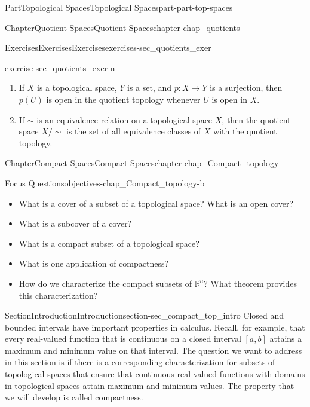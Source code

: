 \documentclass[oneside,10pt,]{book}
\numberwithin{equation}{chapter}
\newcommand{\R}{\mathbb{R}}
\newcommand{\ssim}{\sim}
\begin{document}
\begin{partptx}{Part}{Topological Spaces}{}{Topological Spaces}{}{}{part-part-top-spaces}
\begin{chapterptx}{Chapter}{Quotient Spaces}{}{Quotient Spaces}{}{}{chapter-chap_quotients}
\begin{exercises-section}{Exercises}{Exercises}{}{Exercises}{}{}{exercises-sec_quotients_exer}
\begin{divisionexercise}{13}{}{}{exercise-sec_quotients_exer-n}
\begin{enumerate}[font=\bfseries,label=(\alph*),ref=\alph*]
\item{}If \(X\) is a topological space, \(Y\) is a set, and \(p: X \to Y\) is a surjection, then \(p(U)\) is open in the quotient topology whenever \(U\) is open in \(X\).%
\item{}If \(\sim\) is an equivalence relation on a topological space \(X\), then the quotient space \(X/\ssim\) is the set of all equivalence classes of \(X\) with the quotient topology.%
\end{enumerate}%
\end{divisionexercise}%
\end{exercises-section}
\end{chapterptx}
%
\typeout{************************************************}
\typeout{************************************************}
%
\begin{chapterptx}{Chapter}{Compact Spaces}{}{Compact Spaces}{}{}{chapter-chap_Compact_topology}
\renewcommand*{\chaptername}{Chapter}
\begin{objectives}{Focus Questions}{objectives-chap_Compact_topology-b}
%
\begin{itemize}[label=\textbullet]
\item{}What is a cover of a subset of a topological space? What is an open cover?%
\item{}What is a subcover of a cover?%
\item{}What is a compact subset of a topological space?%
\item{}What is one application of compactness?%
\item{}How do we characterize the compact subsets of \(\R^n\)? What theorem provides this characterization?%
\end{itemize}
\end{objectives}
%
%
\typeout{************************************************}
\typeout{************************************************}
%
\begin{sectionptx}{Section}{Introduction}{}{Introduction}{}{}{section-sec_compact_top_intro}
Closed and bounded intervals have important properties in calculus. Recall, for example, that every real-valued function that is continuous on a closed interval \([a, b]\) attains a maximum and minimum value on that interval. The question we want to address in this section is if there is a corresponding characterization for subsets of topological spaces that ensure that continuous real-valued functions with domains in topological spaces attain maximum and minimum values. The property that we will develop is called compactness.%

\end{sectionptx}
\end{chapterptx}
\end{partptx}
\end{document}

